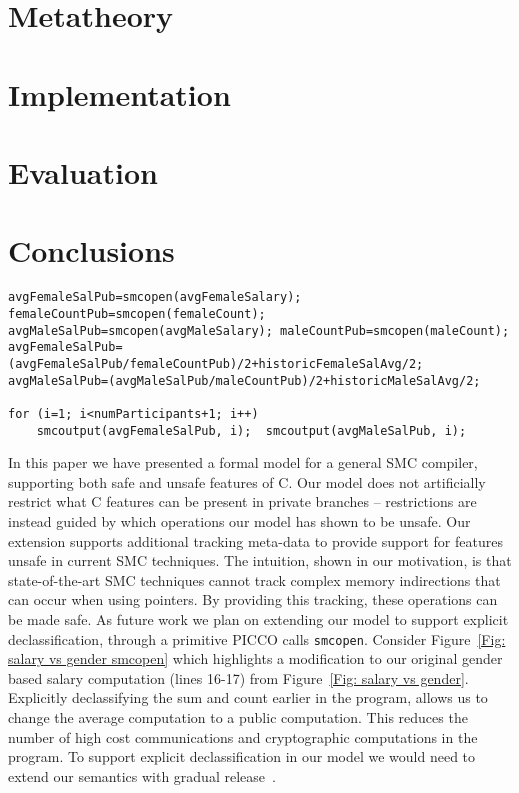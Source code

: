 \documentclass[11pt]{article}
\begin{document}
\section{Metatheory}\label{Sec: Metatheory}



\section{Implementation}
\label{Sec:implementation}


\section{Evaluation}
\label{Sec:evaluation}


\section{Conclusions}
\label{sec:conclusions}

\begin{figure*}  \footnotesize
\begin{lstlisting}[firstnumber = 22]
avgFemaleSalPub=smcopen(avgFemaleSalary); 
femaleCountPub=smcopen(femaleCount);
avgMaleSalPub=smcopen(avgMaleSalary); maleCountPub=smcopen(maleCount);
avgFemaleSalPub=(avgFemaleSalPub/femaleCountPub)/2+historicFemaleSalAvg/2; 
avgMaleSalPub=(avgMaleSalPub/maleCountPub)/2+historicMaleSalAvg/2; 

for (i=1; i<numParticipants+1; i++) 
	smcoutput(avgFemaleSalPub, i);  smcoutput(avgMaleSalPub, i); 
\end{lstlisting}
\caption{Securely calculating the gender pay gap for 100 organizations with additional information released.}
\label{Fig: salary vs gender smcopen}
\end{figure*}

In this paper we have presented a formal model for a general SMC compiler, supporting both safe and unsafe features of C.  
Our model does not artificially restrict what C features can be present in private branches -- restrictions are instead guided by which operations
our model has shown to be unsafe. 
Our extension supports additional tracking meta-data to provide support for features unsafe in
current SMC techniques.  The intuition, shown in our motivation, is that state-of-the-art SMC techniques cannot track complex memory indirections that can occur when using pointers.  By providing this tracking, these operations can be made safe.
As future work we plan on extending our model to support explicit declassification, through a primitive PICCO calls \texttt{smcopen}.   Consider Figure~\ref{Fig: salary vs gender smcopen} which highlights a modification to our original
gender based salary computation (lines 16-17) from Figure~\ref{Fig: salary vs gender}.  Explicitly declassifying the sum and count earlier in the program, allows us to change the average computation to a public computation.  This reduces the number of high cost communications and cryptographic computations in the program.  To support explicit declassification in our model we would need to extend our semantics with gradual 
release~\cite{GR}.
\end{document}
